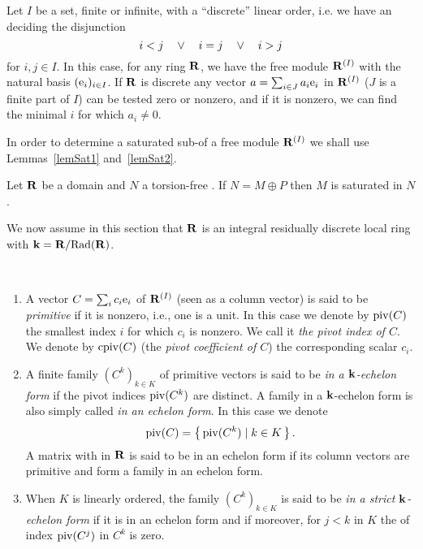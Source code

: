 \medskip Let $I$ be a set, finite or infinite, with a  ``discrete'' linear order, i.e. we have an \algo deciding the disjunction
\[i<j \quad \vee\quad  i=j \quad \vee\quad  i>j\]
for $i,j\in I$. In this case, for any ring $\mathbf{R}$, we have the free module $\mathbf{R}^{(I)}$ with the natural basis $(\mathrm{e}_i)_{i\in I}$. If $\mathbf{R}$ is discrete
 any vector $a=\sum_{i\in J} a_i\mathrm{e}_i$ in  $\mathbf{R}^{(I)}$
($J$ is a finite part of $I$) can be tested zero or nonzero, and if it is nonzero, we can find the minimal
$i$ for which $a_i\neq 0$.

In order to determine a saturated sub-\Rmo of a free module $\mathbf{R}^{(I)}$
we shall use  Lemmas~\ref{lemSat1} and~\ref{lemSat2}.

\begin{lemma} \label{lemSat1}
Let $\mathbf{R}$ be a domain and $N$ a torsion-free \Rmo. If $N=M\oplus P$
then $M$ is saturated in $N$.
\end{lemma}

 We now assume in this section that $\mathbf{R}$ is an integral residually discrete local ring with \hbox{$\mathbf{k}=\mathbf{R}/\mathrm{Rad}(\mathbf{R})$}.
\begin{definota} \label{notaPiv}
{\rm  ~
%
\begin{enumerate}
%
\item A vector $C=\sum_i c_i \mathrm{e}_i$ of $\mathbf{R}^{(I)}$
 (seen as a column vector)
 is said to be \textsl{primitive} if it is \rdt nonzero, i.e., one \coe
 is a unit. In this case we denote by $\mathrm{piv}(C)$ the smallest index
 $i$ for which $c_i$ is \rdt nonzero. We call it \textsl{the pivot index of $C$}. We denote by $\mathrm{cpiv}(C)$
 (the \textsl{pivot coefficient of $C$}) the corresponding scalar $c_i$.
%
\item A finite family $(C^k)_{k\in K}$ of primitive vectors is said to be \textsl{in a $\mathbf{k}$-echelon form}
if the pivot indices $\mathrm{piv}(C^k)$ are distinct. A family in a $\mathbf{k}$-echelon form is also simply called \textsl{in an echelon form}.
In this case we denote
\[
  \mathrm{piv}(C)=\left\{{\,\mathrm{piv}(C^k)\mid k\in K\,}\right\}.
\]
A matrix with \coes in $\mathbf{R}$ is said to be in an echelon form if its column vectors are primitive and form a  family in an echelon form.
%
\item When $K$ is linearly ordered, the family $(C^k)_{k\in K}$ is said to be \textsl{in a strict $\mathbf{k}$-echelon form} if it is in an echelon form and if moreover, for $j<k$ in $K$ the \coe of index $\mathrm{piv}(C^j)$ in $C^k$ is zero.
%
\end{enumerate}
  }
\end{definota}

